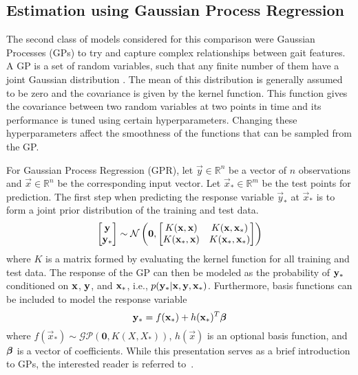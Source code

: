 \subsection{Estimation using Gaussian Process Regression}\label{sec:GPR}

The second class of models considered for this comparison were Gaussian Processes (GPs) to try and capture complex relationships between gait features. A GP is a set of random variables, such that any finite number of them have a joint Gaussian distribution \cite{rasmussen2006gaussian}. The mean of this distribution is generally assumed to be zero and the covariance is given by the kernel function. This function gives the covariance between two random variables at two points in time and its performance is tuned using certain hyperparameters. Changing these hyperparameters affect the smoothness of the functions that can be sampled from the GP.

For Gaussian Process Regression (GPR), let $ \vec{y} \in \mathbb{R}^n $ be a vector of $ n $ observations and $ \vec{x} \in \mathbb{R}^n  $ be the corresponding input vector. Let $ \vec{x}_{*} \in \mathbb{R}^m$ be the test points for prediction. The first step when predicting the response variable $ \vec{y}_{*} $ at $ \vec{x}_{*} $ is to form a joint prior distribution of the training and test data. 
\[
	\begin{bmatrix}
		\y \\
		\y_{*}
	\end{bmatrix} \sim \mathcal{N} \left(\mathbf{0},%
	\begin{bmatrix}
		K(\x,\x) & K(\x,\x_{*}) \\
		K(\x_{*},\x) & K(\x_{*},\x_{*})
	\end{bmatrix}\right)
\]
where $ K $ is a matrix formed by evaluating the kernel function for all training and test data. The response of the GP can then be modeled as the probability of $ \mathbf{y}_{*} $ conditioned on $ \mathbf{x} $, $ \mathbf{y} $, and $ \mathbf{x}_{*} $, i.e., $ p(\mathbf{y}_{*}|\mathbf{x},\mathbf{y},\mathbf{x}_{*}) $. Furthermore, basis functions can be included to model the response variable
\[
	\mathbf{y}_{*} = f(\mathbf{x}_{*}) + h(\mathbf{x}_{*})^T \boldsymbol{\beta}
\]
where $ f(\vec{x}_{*}) \sim \mathcal{GP}(\mathbf{0},K(X,X_{*})) $, $ h(\vec{x}) $ is an optional basis function, and $ \boldsymbol{\beta} $ is a vector of coefficients. While this presentation serves as a brief introduction to GPs, the interested reader is referred to~\cite{rasmussen2006gaussian}.

